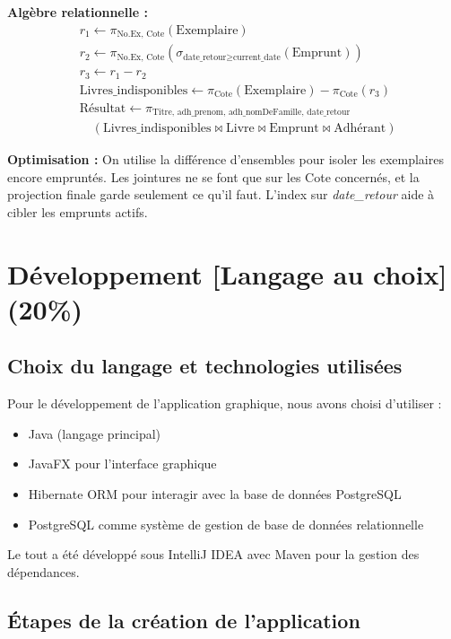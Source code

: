\documentclass[12pt]{article}
\begin{document}
\textbf{Algèbre relationnelle :}
\[
\begin{aligned}
  &r_1 \leftarrow \pi_{\text{No.Ex, Cote}}(\text{Exemplaire}) \\
  &r_2 \leftarrow \pi_{\text{No.Ex, Cote}} (\sigma_{\text{date\_retour} \geq \text{current\_date}} (\text{Emprunt})) \\
  &r_3 \leftarrow r_1 - r_2 \\
  &\text{Livres\_indisponibles} \leftarrow \pi_{\text{Cote}} (\text{Exemplaire}) - \pi_{\text{Cote}} (r_3) \\
  &\text{Résultat} \leftarrow \pi_{\text{Titre, adh\_prenom, adh\_nomDeFamille, date\_retour}} \\
  &\quad (\text{Livres\_indisponibles} \bowtie \text{Livre} \bowtie \text{Emprunt} \bowtie \text{Adhérant})
\end{aligned}
\]

\textbf{Optimisation :}  
On utilise la différence d’ensembles pour isoler les exemplaires encore empruntés. Les jointures ne se font que sur les Cote concernés, et la projection finale garde seulement ce qu’il faut. L’index sur \textit{date\_retour} aide à cibler les emprunts actifs.

\section{Développement [Langage au choix] (20\%)}

\subsection{Choix du langage et technologies utilisées}

Pour le développement de l'application graphique, nous avons choisi d'utiliser :

\begin{itemize}
    \item Java (langage principal)
    \item JavaFX pour l'interface graphique
    \item Hibernate ORM pour interagir avec la base de données PostgreSQL
    \item PostgreSQL comme système de gestion de base de données relationnelle
\end{itemize}

Le tout a été développé sous IntelliJ IDEA avec Maven pour la gestion des dépendances.

\subsection{Étapes de la création de l'application}
\end{document}
